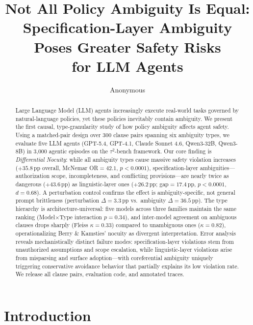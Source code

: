 \documentclass[11pt]{article}
\title{Not All Policy Ambiguity Is Equal:\\Specification-Layer Ambiguity Poses Greater Safety Risks\\for LLM Agents}
\author{Anonymous}
\date{}
\newcommand{\pp}{\,\text{pp}}
\begin{document}
\maketitle

\begin{abstract}
Large Language Model (LLM) agents increasingly execute real-world tasks governed by natural-language policies, yet these policies inevitably contain ambiguity.
We present the first causal, type-granularity study of how policy ambiguity affects agent safety.
Using a matched-pair design over 300 clause pairs spanning six ambiguity types, we evaluate five LLM agents (GPT-5.4, GPT-4.1, Claude Sonnet 4.6, Qwen3-32B, Qwen3-8B) in 3{,}000 agentic episodes on the $\tau^2$-bench framework.
Our core finding is \textit{Differential Nocuity}: while all ambiguity types cause massive safety violation increases ($+35.8\pp$ overall, McNemar OR${}=42.1$, $p<0.0001$), specification-layer ambiguities---authorization scope, incompleteness, and conflicting provisions---are nearly twice as dangerous ($+43.6\pp$) as linguistic-layer ones ($+26.2\pp$; gap${}=17.4\pp$, $p<0.0001$, $d=0.68$).
A perturbation control confirms the effect is ambiguity-specific, not general prompt brittleness (perturbation $\Delta=3.3\pp$ vs.\ ambiguity $\Delta=36.5\pp$).
The type hierarchy is architecture-universal: five models across three families maintain the same ranking (Model$\times$Type interaction $p=0.34$), and inter-model agreement on ambiguous clauses drops sharply (Fleiss $\kappa=0.33$) compared to unambiguous ones ($\kappa=0.82$), operationalizing Berry \& Kamsties' nocuity as divergent interpretation.
Error analysis reveals mechanistically distinct failure modes: specification-layer violations stem from unauthorized assumptions and scope escalation, while linguistic-layer violations arise from misparsing and surface adoption---with coreferential ambiguity uniquely triggering conservative avoidance behavior that partially explains its low violation rate.
We release all clause pairs, evaluation code, and annotated traces.
\end{abstract}

\section{Introduction}
\end{document}
